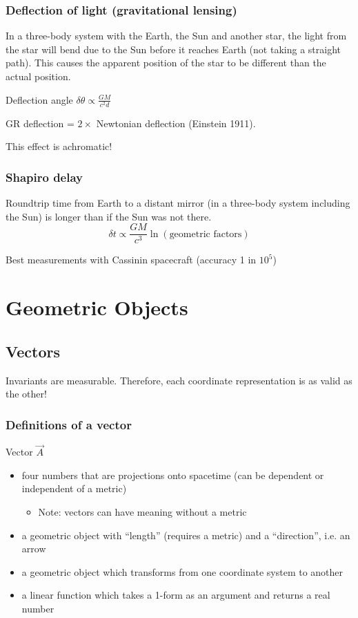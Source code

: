 \documentclass[a4paper]{article} %
\begin{document}
\subsubsection{Deflection of light (gravitational lensing)}
In a three-body system with the Earth, the Sun and another star, the light from the star will bend due to the Sun before it reaches Earth (not taking a straight path). This causes the apparent position of the star to be different than the actual position.

Deflection angle $\delta\theta \propto \frac{GM}{c^2d}$

GR deflection = $2\times$ Newtonian deflection (Einstein 1911). 

This effect is achromatic!

\subsubsection{Shapiro delay}
Roundtrip time from Earth to a distant mirror (in a three-body system including the Sun) is longer than if the Sun was not there.
\begin{equation}
\delta t\propto \frac{GM}{c^3}\ln(\text{geometric factors})
\end{equation}

Best measurements with Cassinin spacecraft (accuracy 1 in $10^5$)

\section{Geometric Objects}

\subsection{Vectors}
Invariants are measurable. Therefore, each coordinate representation is as valid as the other!

\subsubsection{Definitions of a vector}
Vector $\vec{A}$
\begin{itemize}
\item four numbers that are projections onto spacetime (can be dependent or independent of a metric)
\begin{itemize}
\item Note: vectors can have meaning without a metric
\end{itemize}
\item a geometric object with ``length'' (requires a metric) and a ``direction'', i.e. an arrow
\item a geometric object which transforms from one coordinate system to another
\item a linear function which takes a 1-form as an argument and returns a real number
\end{itemize}
\end{document}
